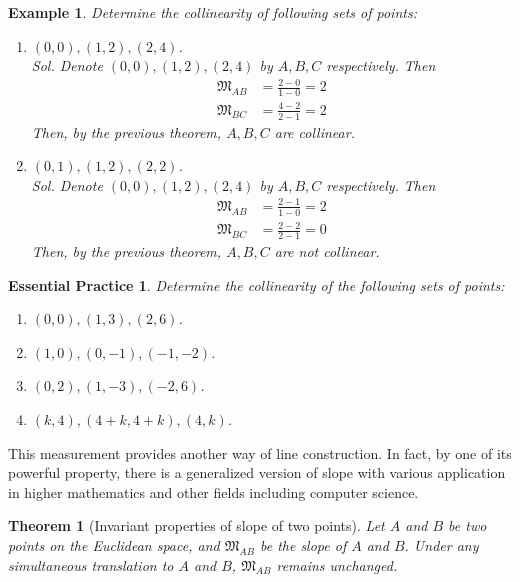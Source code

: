 \documentclass[12pt]{article}
\newtheorem*{theorem}{Theorem}
\newtheorem*{example}{Example}
\newtheorem{exercise}{Essential Practice}[subsubsection]
\begin{document}
    \begin{example}
        Determine the collinearity of following sets of points:\begin{enumerate}
            \item $(0,0), (1,2), (2,4)$.\\
            \textit{ Sol. } Denote $(0,0), (1,2), (2,4)$ by $A,B,C$ respectively. Then \begin{align*}
                \mathfrak{M}_{AB}&=\frac{2-0}{1-0}=2\\
                \mathfrak{M}_{BC}&=\frac{4-2}{2-1}=2
            \end{align*}
            Then, by the previous theorem, $A,B,C$ are collinear.
            \item $(0,1), (1,2), (2,2)$.\\
            \textit{ Sol. } Denote $(0,0), (1,2), (2,4)$ by $A,B,C$ respectively. Then \begin{align*}
                \mathfrak{M}_{AB}&=\frac{2-1}{1-0}=2\\
                \mathfrak{M}_{BC}&=\frac{2-2}{2-1}=0
            \end{align*}
            Then, by the previous theorem, $A,B,C$ are not collinear.
        \end{enumerate}
    \end{example}

    \begin{exercise}
        Determine the collinearity of the following sets of points:\begin{enumerate}
            \item $(0,0), (1,3), (2,6)$.
            \item $(1,0), (0,-1), (-1,-2)$.
            \item $(0,2), (1,-3), (-2,6)$.
            \item $(k,4), (4+k,4+k), (4,k)$.
        \end{enumerate}
    \end{exercise}

    This measurement provides another way of line construction. In fact, by one of its powerful property, there is a generalized version of slope with various application in higher mathematics and other fields including computer science.

    \begin{theorem}[Invariant properties of slope of two points]
        Let $A$ and $B$ be two points on the Euclidean space, and $\mathfrak{M}_{AB}$ be the slope of $A$ and $B$. Under any simultaneous translation to $A$ and $B$, $\mathfrak{M}_{AB}$ remains unchanged.
    \end{theorem}
\end{document}
